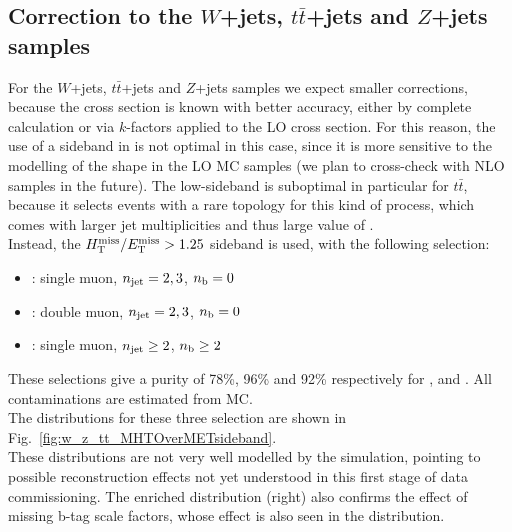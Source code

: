 \subsection{Correction to the $W$+jets, $t\bar{t}$+jets and $Z$+jets samples}
\label{sec:sideband_corrections_w_z_tt}
For the $W$+jets, $t\bar{t}$+jets and $Z$+jets samples we expect smaller corrections, because the cross section is known 
with better accuracy, either by complete calculation or via $k$-factors applied to the LO cross section. 
For this reason, the use of a sideband in \scalht is not optimal in this case, since it is more sensitive to the modelling 
of the \scalht shape in the LO MC samples (we plan to cross-check with NLO samples in the future). 
The low-\scalht sideband is suboptimal in particular for $t\bar{t}$, because 
it selects events with a rare topology for this kind of process, which comes with larger jet multiplicities and thus large value of \scalht. \\
Instead, the $\mbox{$\mbox{$H_{\rm T}^{\rm miss}$} / \mbox{$E_\text{T}^{\rm miss}$}$} > 1.25$ sideband is used, with the following selection:
\begin{itemize}
\item \wj: single muon, $n_{\mathrm{jet}} = 2,3$, $n_{\text{b}} = 0$
\item \zj: double muon, $n_{\mathrm{jet}} = 2,3$, $n_{\text{b}} = 0$
\item \ttj: single muon, $n_{\mathrm{jet}} \geq 2$, $n_{\text{b}} \geq 2$
\end{itemize}

These selections give a purity of 78\%, 96\% and 92\% respectively for \wj, \zj and \ttj. All contaminations are estimated from MC.\\
The \mhtmet distributions for these three selection are shown in Fig.~\ref{fig:w_z_tt_MHTOverMETsideband}. \\
These distributions are not very well modelled by the simulation, pointing to possible reconstruction effects not yet understood in this first stage of data commissioning. 
The \ttj enriched distribution (right) also confirms the effect of missing b-tag scale factors, whose effect is also seen in the \nb  distribution. %

